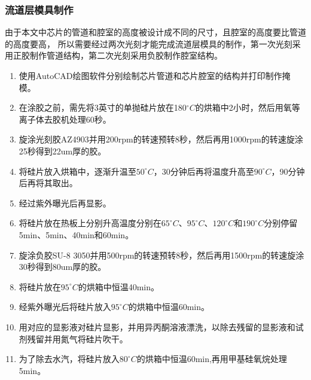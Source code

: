 \subsubsection{流道层模具制作}
	由于本文中芯片的管道和腔室的高度被设计成不同的尺寸，且腔室的高度要比管道的高度要高，
	所以需要经过两次光刻才能完成流道层模具的制作，第一次光刻采用正胶制作管道结构，第二次光刻采用负胶制作腔室结构。
	\begin{enumerate}[label={\alph*)},font={\color{black!50!black}\bfseries}]
	\item 使用AutoCAD绘图软件分别绘制芯片管道和芯片腔室的结构并打印制作掩模。
	\item 在涂胶之前，需先将3英寸的单抛硅片放在180$^\circ C$的烘箱中2小时，然后用氧等离子体去胶机处理60秒。
	\item 旋涂光刻胶AZ4903并用200rpm的转速预转8秒，然后再用1000rpm的转速旋涂25秒得到22um厚的胶。
	\item 将硅片放入烘箱中，逐渐升温至$50^\circ C$，30分钟后再将温度升高至$90^\circ C$，90分钟后再将其取出。
	\item 经过紫外曝光后再显影。
	\item 将硅片放在热板上分别升高温度分别在$65^\circ C$、$95^\circ C$、$120^\circ C$和$190^\circ C$分别停留
	5min、5min、40min和60min。
	\item 旋涂负胶SU-8 3050并用500rpm的转速预转8秒，然后再用1500rpm的转速旋涂30秒得到80um厚的胶。
	\item 将硅片放在$95^\circ C$的烘箱中恒温40min。
	\item 经紫外曝光后将硅片放入$95^\circ C$的烘箱中恒温60min。
	\item 用对应的显影液对硅片显影，并用异丙酮溶液漂洗，以除去残留的显影液和试剂残留并用氮气将硅片吹干。
	\item 为了除去水汽，将硅片放入$80^\circ C$的烘箱中恒温60min,再用甲基硅氧烷处理5min。
	\end{enumerate}
